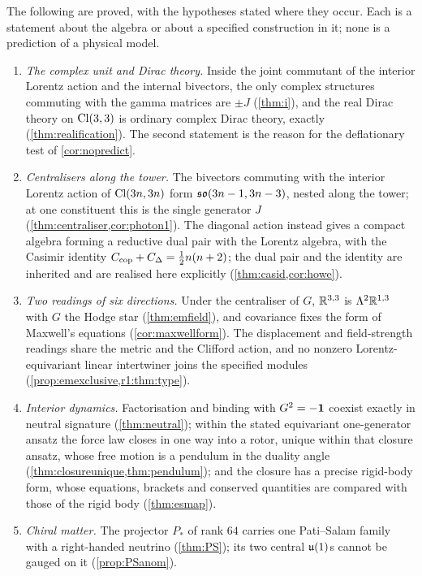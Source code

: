 The following are proved, with the hypotheses stated where they occur. Each is a statement about the algebra or about a specified
construction in it; none is a prediction of a physical model.
\begin{enumerate}[label=(\arabic*),leftmargin=2.2em]
\item \emph{The complex unit and Dirac theory.} Inside the joint commutant of the interior Lorentz action and the internal bivectors, the
only complex structures commuting with the gamma matrices are $\pm J$ (\cref{thm:i}), and the real Dirac theory on $\mathrm{Cl}(3,3)$ is ordinary complex
Dirac theory, exactly (\cref{thm:realification}). The second statement is the reason for the deflationary test of \cref{cor:nopredict}.
\item \emph{Centralisers along the tower.} The bivectors commuting with the interior Lorentz action of $\mathrm{Cl}(3n,3n)$ form $\mathfrak{so}(3n-1,3n-3)$,
nested along the tower; at one constituent this is the single generator $J$ (\cref{thm:centraliser,cor:photon1}). The diagonal action instead
gives a compact algebra forming a reductive dual pair with the Lorentz algebra, with the Casimir identity $C_{\rm cop}+C_\Delta=\tfrac12n(n+2)$; the dual
pair and the identity are inherited \cite{Howe89,Neergard19} and are realised here explicitly (\cref{thm:casid,cor:howe}).
\item \emph{Two readings of six directions.} Under the centraliser of $G$, $\mathbb{R}^{3,3}$ is $\Lambda^2\mathbb{R}^{1,3}$ with $G$ the Hodge star
(\cref{thm:emfield}), and covariance fixes the form of Maxwell's equations (\cref{cor:maxwellform}). The displacement and field-strength readings
share the metric and the Clifford action, and no nonzero Lorentz-equivariant linear intertwiner joins the specified modules (\cref{prop:emexclusive,r1:thm:type}).
\item \emph{Interior dynamics.} Factorisation and binding with $G^2=-\mathbf 1$ coexist exactly in neutral signature (\cref{thm:neutral}); within the stated equivariant one-generator ansatz the force law closes in one
way into a rotor, unique within that closure ansatz, whose free motion is a pendulum in the duality angle (\cref{thm:closureunique,thm:pendulum}); and the closure has a precise
rigid-body form, whose equations, brackets and conserved quantities are compared with those of the rigid body (\cref{thm:esmap}).
\item \emph{Chiral matter.} The projector $P_*$ of rank $64$ carries one Pati--Salam family with a right-handed neutrino (\cref{thm:PS}); its two
central $\mathfrak{u}(1)$s cannot be gauged on it (\cref{prop:PSanom}).

\end{enumerate}
